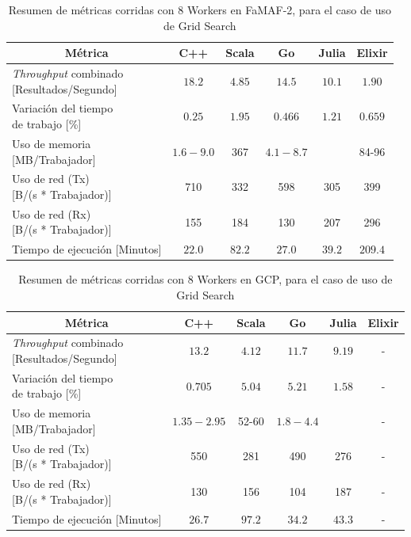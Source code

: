 \documentclass[11pt]{article}
\providecommand{\row}[1]{\parbox{150pt}{\setlength{\baselineskip}{0.2\baselineskip}\strut#1\strut}}
\newcommand{\english}[1]{\textit{#1}}
\begin{document}
\begin{table}[H]
\centering
\begin{tabular}{|l|c|c|c|c|c|}
\hline
\multicolumn{1}{|c|}{Métrica} & C++ & Scala & Go & Julia & Elixir \\ \hline
\row{\english{Throughput} combinado \\ {[Resultados/Segundo]}} & $18.2$ & $4.85$ & $14.5$ & $10.1$ & $1.90$ \\ \hline
\row{Variación del tiempo \\ de trabajo {[}\%{]}} & $0.25$ & $1.95$ & $0.466$ & $1.21$ & $0.659$ \\ \hline
\row{Uso de memoria \\ {[}MB/Trabajador{]}} & $1.6-9.0$ & 367 & $4.1-8.7$ &  & 84-96 \\ \hline
\row{Uso de red (Tx)\\ {[}B/(s * Trabajador){]}} & 710 & 332 & 598 & 305 & 399 \\ \hline
\row{Uso de red (Rx)\\ {[}B/(s * Trabajador){]}} & 155 & 184 & 130 & 207 & 296 \\ \hline
Tiempo de ejecución {[}Minutos{]} & $22.0$ & $82.2$ & $27.0$ & $39.2$ & $209.4$ \\ \hline
\end{tabular}
\caption{Resumen de métricas corridas con 8 Workers en FaMAF-2, para el caso de uso de Grid Search}
\label{tab:gs:8_workers_famaf2}
\end{table}


\begin{table}[H]
\centering
\begin{tabular}{|l|c|c|c|c|c|}
\hline
\multicolumn{1}{|c|}{Métrica} & C++ & Scala & Go & Julia & Elixir \\ \hline
\row{\english{Throughput} combinado\\{[Resultados/Segundo]}} & $13.2$ & $4.12$ & $11.7$ & $9.19$ & - \\ \hline
\row{Variación del tiempo \\ de trabajo {[}\%{]}} & $0.705$ & $5.04$ & $5.21$ & $1.58$ & - \\ \hline
\row{Uso de memoria \\ {[}MB/Trabajador{]}} & $1.35-2.95$ & 52-60 & $1.8-4.4$ &  & - \\ \hline
\row{Uso de red (Tx)\\ {[}B/(s * Trabajador){]}} & 550 & 281 & 490 & 276 & - \\ \hline
\row{Uso de red (Rx)\\ {[}B/(s * Trabajador){]}} & 130 & 156 & 104 & 187 & - \\ \hline
Tiempo de ejecución {[}Minutos{]} & $26.7$ & $97.2$ & $34.2$ & $43.3$ & - \\ \hline
\end{tabular}
\caption{Resumen de métricas corridas con 8 Workers en GCP, para el caso de uso de Grid Search}
\label{tab:gs:image_sizes}
\end{table}
\end{document}
